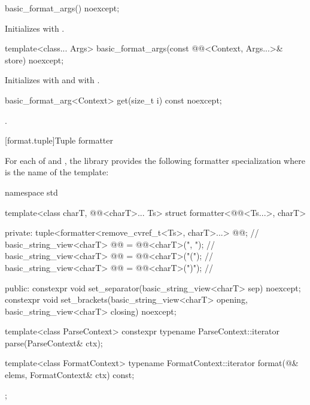 %
\begin{itemdecl}
basic_format_args() noexcept;
\end{itemdecl}

\begin{itemdescr}
\pnum
\effects
Initializes  with .
\end{itemdescr}

%
\begin{itemdecl}
template<class... Args>
  basic_format_args(const @@<Context, Args...>& store) noexcept;
\end{itemdecl}

\begin{itemdescr}
\pnum
\effects
Initializes
 with  and
 with .
\end{itemdescr}

%
\begin{itemdecl}
basic_format_arg<Context> get(size_t i) const noexcept;
\end{itemdecl}

\begin{itemdescr}
\pnum
\returns
{}.
\end{itemdescr}

[format.tuple]{Tuple formatter}

\pnum
For each of  and ,
the library provides the following formatter specialization
where  is the name of the template:

%
\begin{codeblock}
namespace std {
  template<class charT, @@<charT>... Ts>
  struct formatter<@@<Ts...>, charT> {
  private:
    tuple<formatter<remove_cvref_t<Ts>, charT>...> @@;               // \expos
    basic_string_view<charT> @@ = @@<charT>(", ");      // \expos
    basic_string_view<charT> @@ = @@<charT>("("); // \expos
    basic_string_view<charT> @@ = @@<charT>(")"); // \expos

  public:
    constexpr void set_separator(basic_string_view<charT> sep) noexcept;
    constexpr void set_brackets(basic_string_view<charT> opening,
                                basic_string_view<charT> closing) noexcept;

    template<class ParseContext>
      constexpr typename ParseContext::iterator
        parse(ParseContext& ctx);

    template<class FormatContext>
      typename FormatContext::iterator
        format(@\seebelow@& elems, FormatContext& ctx) const;
  };
}
\end{codeblock}


